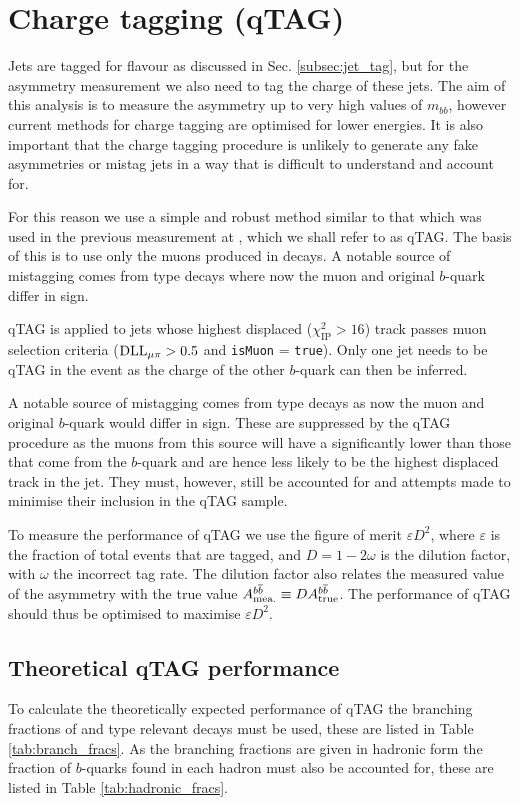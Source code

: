 \section{Charge tagging (qTAG)} \label{sec:qtag}
Jets are tagged for flavour as discussed in Sec. \ref{subsec:jet_tag}, but for the asymmetry measurement we also need to tag the charge of these jets. The aim of this analysis is to measure the asymmetry up to very high values of $m_{bb}$, however current \lhcb methods for charge tagging are optimised for lower energies. It is also important that the charge tagging procedure is unlikely to generate any fake asymmetries or mistag jets in a way that is difficult to understand and account for.

For this reason we use a simple and robust method similar to that which was used in the previous measurement at \lhcb \cite{LHCb-PAPER-2014-023}, which we shall refer to as qTAG. The basis of this is to use only the muons produced in  decays. A notable source of mistagging comes from  type decays where now the muon and original $b$-quark differ in sign. 

qTAG is applied to jets whose highest \pt displaced ($\chi^2_\text{IP}>16$) track passes muon selection criteria ($\mathrm{DLL}_{{\mu}\pi}>0.5$ and \texttt{isMuon} = \texttt{true}). Only one jet needs to be qTAG in the event as the charge of the other $b$-quark can then be inferred.

A notable source of mistagging comes from  type decays as now the muon and original $b$-quark would differ in sign. These are suppressed by the qTAG procedure as the muons from this source will have a significantly lower \pt than those that come from the $b$-quark and are hence less likely to be the highest \pt displaced track in the jet. They must, however, still be accounted for and attempts made to minimise their inclusion in the qTAG sample.

To measure the performance of qTAG we use the figure of merit $\varepsilon D^2$, where $\varepsilon$ is the fraction of total events that are tagged, and $D = 1 - 2\omega$ is the dilution factor, with $\omega$ the incorrect tag rate. The dilution factor also relates the measured value of the asymmetry with the true value $A^{{b}{\overline {{b}}}}_{\text{mea.}} \equiv D A^{{b}{\overline {{b}}}}_{\text{true}}$. The performance of qTAG should thus be optimised to maximise $\varepsilon D^2$.


\subsection{Theoretical qTAG performance}
To calculate the theoretically expected performance of qTAG the branching fractions of  and  type relevant decays must be used, these are listed in Table \ref{tab:branch_fracs}. As the branching fractions are given in hadronic form the fraction of $b$-quarks found in each hadron must also be accounted for, these are listed in Table \ref{tab:hadronic_fracs}.

